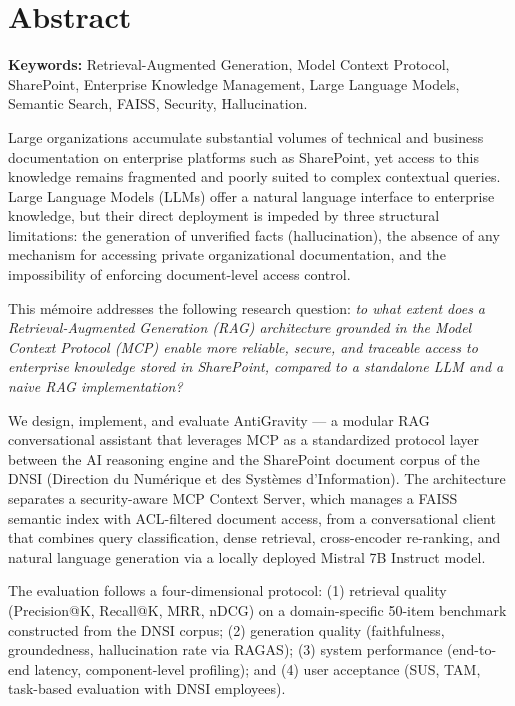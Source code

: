 \chapter*{Abstract}

\textbf{Keywords:} Retrieval-Augmented Generation, Model Context Protocol, SharePoint, Enterprise Knowledge Management, Large Language Models, Semantic Search, FAISS, Security, Hallucination.

\bigskip

Large organizations accumulate substantial volumes of technical and business documentation on enterprise platforms such as SharePoint, yet access to this knowledge remains fragmented and poorly suited to complex contextual queries. Large Language Models (LLMs) offer a natural language interface to enterprise knowledge, but their direct deployment is impeded by three structural limitations: the generation of unverified facts (hallucination), the absence of any mechanism for accessing private organizational documentation, and the impossibility of enforcing document-level access control.

This mémoire addresses the following research question: \textit{to what extent does a Retrieval-Augmented Generation (RAG) architecture grounded in the Model Context Protocol (MCP) enable more reliable, secure, and traceable access to enterprise knowledge stored in SharePoint, compared to a standalone LLM and a naive RAG implementation?}

We design, implement, and evaluate AntiGravity --- a modular RAG conversational assistant that leverages MCP as a standardized protocol layer between the AI reasoning engine and the SharePoint document corpus of the DNSI (Direction du Num\'{e}rique et des Syst\`{e}mes d'Information). The architecture separates a security-aware MCP Context Server, which manages a FAISS semantic index with ACL-filtered document access, from a conversational client that combines query classification, dense retrieval, cross-encoder re-ranking, and natural language generation via a locally deployed Mistral 7B Instruct model.

The evaluation follows a four-dimensional protocol: (1) retrieval quality (Precision@K, Recall@K, MRR, nDCG) on a domain-specific 50-item benchmark constructed from the DNSI corpus; (2) generation quality (faithfulness, groundedness, hallucination rate via RAGAS); (3) system performance (end-to-end latency, component-level profiling); and (4) user acceptance (SUS, TAM, task-based evaluation with DNSI employees).

